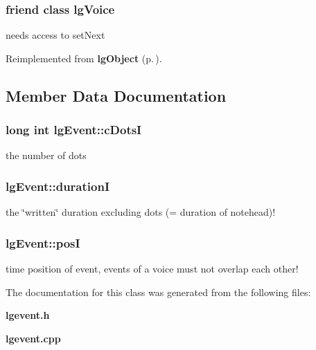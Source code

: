 \subsubsection{\setlength{\rightskip}{0pt plus 5cm}friend class {\bf lg\-Voice}\hspace{0.3cm}{\tt  [friend]}}\label{classlgEvent_n0}


needs access to set\-Next 



Reimplemented from {\bf lg\-Object} {\rm (p.\,\pageref{classlgObject_n1})}.

\subsection{Member Data Documentation}
\subsubsection{\setlength{\rightskip}{0pt plus 5cm}long int {\bf lg\-Event::c\-Dots\-I}\hspace{0.3cm}{\tt  [private]}}\label{classlgEvent_r2}


the number of dots 

\subsubsection{ {\bf lg\-Event::duration\-I}\hspace{0.3cm}{\tt  [private]}}\label{classlgEvent_r1}


the \char`\"{}written\char`\"{} duration excluding dots (= duration of notehead)! 

\subsubsection{ {\bf lg\-Event::pos\-I}\hspace{0.3cm}{\tt  [private]}}\label{classlgEvent_r0}


time position of event, events of a voice must not overlap each other! 



The documentation for this class was generated from the following files:\begin{CompactItemize}
\item 
{\bf lgevent.h}\item 
{\bf lgevent.cpp}\end{CompactItemize}
